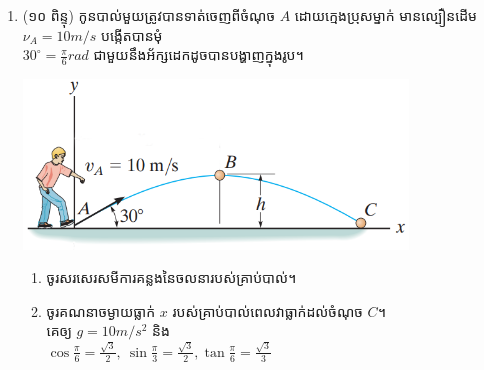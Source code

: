 \documentclass{officialexam}
\begin{document}
\begin{enumerate}[I]
\begin{enumerate}[k]
		\end{enumerate}
		\item (១០ ពិន្ទុ) កូនបាល់មួយត្រូវបានទាត់ចេញពីចំណុច $A$ ដោយក្មេងប្រុសម្នាក់ មានល្បឿនដើម $\nu_A=10m/s$ បង្កើតបានមុំ\\ $30^\circ=\frac{\pi}{6}rad$ ជាមួយនឹងអ័ក្សដេកដូចបានបង្ហាញក្នុងរូប។
		\begin{multicols}{2}
			\includegraphics[scale=1.8, height=128pt]{pic2}
			\begin{enumerate}[k]
				\item ចូរសរសេរសមីការគន្លងនៃចលនារបស់គ្រាប់បាល់។
				\item ចូរគណនាចម្ងាយធ្លាក់ $x$ របស់គ្រាប់បាល់ពេលវាធ្លាក់ដល់ចំណុច $C$។\\
				គេឲ្យ $g=10m/s^2$ និង\\ $\cos\frac{\pi}{6}=\frac{\sqrt{3}}{2},~\sin\frac{\pi}{3}=\frac{\sqrt{3}}{2}, \tan\frac{\pi}{6}=\frac{\sqrt{3}}{3}$
			\end{enumerate}
		\end{multicols}
	\end{enumerate}
\end{document}
